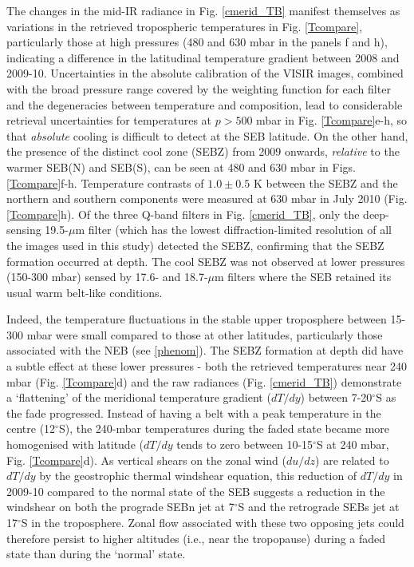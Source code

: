 \documentclass[final,5p,times,twocolumn,authoryear]{elsarticle}
\newcommand{\degree}{\ensuremath{^\circ}}
\begin{document}
The changes in the mid-IR radiance in Fig. \ref{cmerid_TB} manifest themselves as variations in the retrieved tropospheric temperatures in Fig. \ref{Tcompare}, particularly those at high pressures (480 and 630 mbar in the panels f and h), indicating a difference in the latitudinal temperature gradient between 2008 and 2009-10.  Uncertainties in the absolute calibration of the VISIR images, combined with the broad pressure range covered by the weighting function for each filter \citep{09fletcher_imaging} and the degeneracies between temperature and composition, lead to considerable retrieval uncertainties for temperatures at $p>500$ mbar in Fig. \ref{Tcompare}e-h, so that \textit{absolute} cooling is difficult to detect at the SEB latitude.  On the other hand, the presence of the distinct cool zone (SEBZ) from 2009 onwards, \textit{relative} to the warmer SEB(N) and SEB(S), can be seen at 480 and 630 mbar in Figs. \ref{Tcompare}f-h.   Temperature contrasts of $1.0\pm0.5$ K between the SEBZ and the northern and southern components were measured at 630 mbar in July 2010 (Fig. \ref{Tcompare}h).  Of the three Q-band filters in Fig. \ref{cmerid_TB}, only the deep-sensing 19.5-$\mu$m filter (which has the lowest diffraction-limited resolution of all the images used in this study) detected the SEBZ, confirming that the SEBZ formation occurred at depth. The cool SEBZ was not observed at lower pressures (150-300 mbar) sensed by 17.6- and 18.7-$\mu$m filters where the SEB retained its usual warm belt-like conditions.   

Indeed, the temperature fluctuations in the stable upper troposphere between 15-300 mbar were small compared to those at other latitudes, particularly those associated with the NEB (see \ref{phenom}).  The SEBZ formation at depth did have a subtle effect at these lower pressures - both the retrieved temperatures near 240 mbar (Fig. \ref{Tcompare}d) and the raw radiances (Fig. \ref{cmerid_TB}) demonstrate a `flattening' of the meridional temperature gradient ($dT/dy$) between 7-20\degree S as the fade progressed.  Instead of having a belt with a peak temperature in the centre (12$^\circ$S), the 240-mbar temperatures during the faded state became more homogenised with latitude ($dT/dy$ tends to zero between 10-15$^\circ$S at 240 mbar, Fig. \ref{Tcompare}d).  As vertical shears on the zonal wind ($du/dz$) are related to $dT/dy$ by the geostrophic thermal windshear equation, this reduction of $dT/dy$ in 2009-10 compared to the normal state of the SEB suggests a reduction in the windshear on both the prograde SEBn jet at 7\degree S and the retrograde SEBs jet at 17\degree S in the troposphere.  Zonal flow associated with these two opposing jets could therefore persist to higher altitudes (i.e., near the tropopause) during a faded state than during the `normal' state.  
\end{document}
